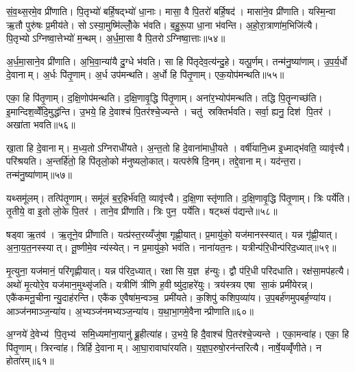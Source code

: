 सं॒व॒थ्स॒रमे॒व प्री॑णाति। पि॒तृभ्यो॑ बर्\mbox{}हि॒षद्भ्यो॑ धा॒नाः। मासा॒ वै पि॒तरो॑ बर्\mbox{}हि॒षद॑। मासा॑ने॒व प्री॑णाति। यस्मि॒न्वा ऋ॒तौ पुरु॑षः प्र॒मीय॑ते। सोऽस्या॒मुष्मि॑ल्लोँ॒के भ॑वति। ब॒हु॒रू॒पा धा॒ना भ॑वन्ति। अ॒हो॒रा॒त्राणा॑म॒भिजि॑त्यै। पि॒तृभ्योऽग्निष्वा॒त्तेभ्यो॑ म॒न्थम्। अ॒र्ध॒मा॒सा वै पि॒तरोऽग्निष्वा॒त्ताः॥५४॥

अ॒र्ध॒मा॒साने॒व प्री॑णाति। अ॒भि॒वा॒न्या॑यै दु॒ग्धे भ॑वति। सा हि पि॑तृदेव॒त्य॑न्दु॒हे। यत्पू॒र्णम्। तन्म॑नु॒ष्या॑णाम्। उ॒प॒र्य॒र्धो दे॒वानाम्। अ॒र्धः पि॑तृ॒णाम्। अ॒र्ध उप॑मन्थति। अ॒र्धो हि पि॑तृ॒णाम्। एक॒योप॑मन्थति॥५५॥

एका॒ हि पि॑तृ॒णाम्। द॒क्षि॒णोप॑मन्थति। द॒क्षि॒णावृ॒द्धि पि॑तृ॒णाम्। अना॑र॒भ्योप॑मन्थति। तद्धि पि॒तॄन्गच्छ॑ति। इ॒मान्दिश॒व्वेँदि॒मुद्ध॑न्ति। उ॒भये॒ हि दे॒वाश्च॑ पि॒तर॑श्चे॒ज्यन्ते। चतु॑ स्रक्तिर्भवति। सर्वा॒ ह्यनु॒ दिश॑ पि॒तर॑। अखा॑ता भवति॥५६॥

खा॒ता हि दे॒वानाम्। म॒ध्य॒तोऽग्निराधी॑यते। अ॒न्त॒तो हि दे॒वाना॑माधी॒यते। वर्\mbox{}षी॑यानि॒ध्म इ॒ध्माद्भ॑वति॒ व्यावृ॑त्त्यै। परि॑श्रयति। अ॒न्तर्\mbox{}हि॑तो॒ हि पि॑तृलो॒को म॑नुष्यलो॒कात्। यत्परु॑षि दि॒नम्। तद्दे॒वानाम्। यद॑न्त॒रा। तन्म॑नु॒ष्या॑णाम्॥५७॥

यथ्समू॑लम्। तत्पि॑तृ॒णाम्। समू॑लं ब॒र्॒हिर्भ॑वति॒ व्यावृ॑त्त्यै। द॒क्षि॒णा स्तृ॑णाति। द॒क्षि॒णावृ॒द्धि पि॑तृ॒णाम्। त्रिः पर्ये॑ति। तृ॒तीये॒ वा इ॒तो लो॒के पि॒तर॑। ताने॒व प्री॑णाति। त्रिः पुन॒ पर्ये॑ति। षट्थ्सं प॑द्यन्ते॥५८॥

षड्वा ऋ॒तव॑। ऋ॒तूने॒व प्री॑णाति। यत्प्र॑स्त॒रय्यँजु॑षा गृह्णी॒यात्। प्र॒मायु॑को॒ यज॑मानस्स्यात्। यन्न गृ॑ह्णी॒यात्। अ॒ना॒य॒त॒नस्स्यात्। तू॒ष्णीमे॒व न्य॑स्येत्। न प्र॒मायु॑को॒ भव॑ति। नाना॑यत॒नः। यत्रीन्प॑रि॒धीन्प॑रिद॒ध्यात्॥५९॥

मृ॒त्युना॒ यज॑मानं॒ परि॑गृह्णीयात्। यन्न प॑रिद॒ध्यात्। रक्षासि य॒ज्ञ ह॑न्युः। द्वौ प॑रि॒धी परि॑दधाति। रक्ष॑सा॒मप॑हत्यै। अथो॑ मृ॒त्योरे॒व यज॑मान॒मुथ्सृ॑जति। यत्रीणि॑ त्रीणि ह॒वीष्यु॑दा॒हरे॑युः। त्रय॑स्त्रय एषा सा॒कं प्रमी॑येरन्न्। एकै॑कमनू॒चीनान्यु॒दाह॑रन्ति। एकै॑क ए॒वैषा॑म॒न्वञ्च॒ प्रमी॑यते। क॒शिपु॑ कशिप॒व्या॑य। उ॒प॒बर्\mbox{}ह॑णमुपबर्\mbox{}ह॒ण्या॑य। आञ्ज॑नमाञ्ज॒न्या॑य। अ॒भ्यञ्ज॑नमभ्यञ्ज॒न्या॑य। य॒था॒भा॒गमे॒वैनान्प्रीणाति॥६०॥

अ॒ग्नये॑ दे॒वेभ्य॑ पि॒तृभ्य॑ समि॒ध्यमा॑ना॒यानु॑ ब्रू॒हीत्या॑ह। उ॒भये॒ हि दै॒वाश्च॑ पि॒तर॑श्चे॒ज्यन्ते। एका॒मन्वा॑ह। एका॒ हि पि॑तृ॒णाम्। त्रिरन्वा॑ह। त्रिर्\mbox{}हि दे॒वानाम्। आ॒घा॒रावाघा॑रयति। य॒ज्ञ॒प॒रुषो॒रन॑न्तरित्यै। नार्\mbox{}षे॒यव्वृँ॑णीते। न होता॑रम्॥६१॥

